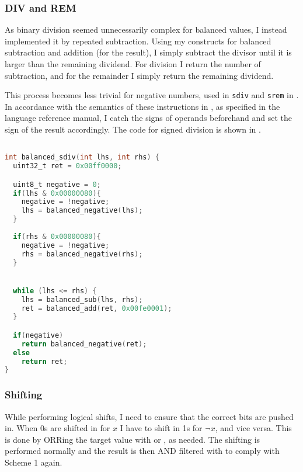 \subsubsection{DIV and REM}
As binary division seemed unnecessarily complex for balanced values, I instead implemented it by repeated subtraction.
Using my constructs for balanced subtraction and addition (for the result), I simply subtract the divisor until it is larger than the remaining dividend.
For division I return the number of subtraction, and for the remainder I simply return the remaining dividend.

This process becomes less trivial for negative numbers, used in \texttt{sdiv} and \texttt{srem} in \ir{}.
In accordance with the semantics of these instructions in \ir{}, as specified in the \llvm{} language reference manual\cite{lattner2006llvm}, I catch the signs of operands beforehand and set the sign of the result accordingly.
The code for signed division is shown in .

\begin{lstlisting}[language=C, caption=Balanced signed division, label=lst:sdiv]

int balanced_sdiv(int lhs, int rhs) {
  uint32_t ret = 0x00ff0000;

  uint8_t negative = 0;
  if(lhs & 0x00000080){
    negative = !negative;
    lhs = balanced_negative(lhs);
  }
  
  if(rhs & 0x00000080){
    negative = !negative;
    rhs = balanced_negative(rhs);
  }


  while (lhs <= rhs) {
    lhs = balanced_sub(lhs, rhs);
    ret = balanced_add(ret, 0x00fe0001);
  }

  if(negative)
    return balanced_negative(ret);
  else
    return ret;
}

\end{lstlisting}

\subsubsection{Shifting}
While performing logical shifts, I need to ensure that the correct bits are pushed in.
When 0s are shifted in for $x$ I have to shift in 1s for $\neg{x}$, and vice versa.
This is done by ORRing the target value with  or , as needed.
The shifting is performed normally and the result is then AND filtered with  to comply with Scheme 1 again.

